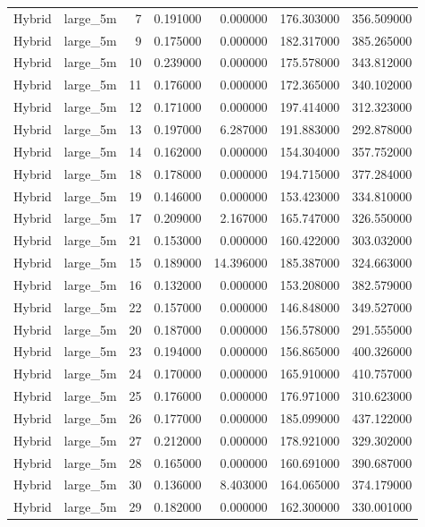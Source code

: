 \begin{tabular}{llrrrrr}
Hybrid & large_5m & 7 & 0.191000 & 0.000000 & 176.303000 & 356.509000 \\
Hybrid & large_5m & 9 & 0.175000 & 0.000000 & 182.317000 & 385.265000 \\
Hybrid & large_5m & 10 & 0.239000 & 0.000000 & 175.578000 & 343.812000 \\
Hybrid & large_5m & 11 & 0.176000 & 0.000000 & 172.365000 & 340.102000 \\
Hybrid & large_5m & 12 & 0.171000 & 0.000000 & 197.414000 & 312.323000 \\
Hybrid & large_5m & 13 & 0.197000 & 6.287000 & 191.883000 & 292.878000 \\
Hybrid & large_5m & 14 & 0.162000 & 0.000000 & 154.304000 & 357.752000 \\
Hybrid & large_5m & 18 & 0.178000 & 0.000000 & 194.715000 & 377.284000 \\
Hybrid & large_5m & 19 & 0.146000 & 0.000000 & 153.423000 & 334.810000 \\
Hybrid & large_5m & 17 & 0.209000 & 2.167000 & 165.747000 & 326.550000 \\
Hybrid & large_5m & 21 & 0.153000 & 0.000000 & 160.422000 & 303.032000 \\
Hybrid & large_5m & 15 & 0.189000 & 14.396000 & 185.387000 & 324.663000 \\
Hybrid & large_5m & 16 & 0.132000 & 0.000000 & 153.208000 & 382.579000 \\
Hybrid & large_5m & 22 & 0.157000 & 0.000000 & 146.848000 & 349.527000 \\
Hybrid & large_5m & 20 & 0.187000 & 0.000000 & 156.578000 & 291.555000 \\
Hybrid & large_5m & 23 & 0.194000 & 0.000000 & 156.865000 & 400.326000 \\
Hybrid & large_5m & 24 & 0.170000 & 0.000000 & 165.910000 & 410.757000 \\
Hybrid & large_5m & 25 & 0.176000 & 0.000000 & 176.971000 & 310.623000 \\
Hybrid & large_5m & 26 & 0.177000 & 0.000000 & 185.099000 & 437.122000 \\
Hybrid & large_5m & 27 & 0.212000 & 0.000000 & 178.921000 & 329.302000 \\
Hybrid & large_5m & 28 & 0.165000 & 0.000000 & 160.691000 & 390.687000 \\
Hybrid & large_5m & 30 & 0.136000 & 8.403000 & 164.065000 & 374.179000 \\
Hybrid & large_5m & 29 & 0.182000 & 0.000000 & 162.300000 & 330.001000 \\

\end{tabular}
